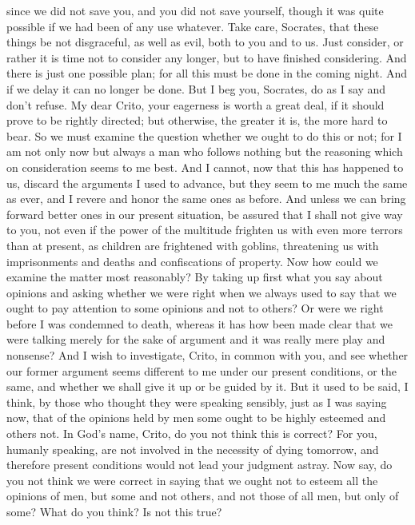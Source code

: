 \documentclass[letterpaper,12pt]{article}
\begin{document}
\begin{drama}
 since we did not save you, and you did not save yourself, though it was quite possible if we had been of any use whatever. Take care, Socrates, that these things be not disgraceful, as well as evil, both to you and to us. Just consider, or rather it is time not to consider any longer, but to have finished considering. And there is just one possible plan; for all this must be done in the coming night. And if we delay it can no longer be done. But I beg you, Socrates, do as I say and don't refuse. 
\socratesspeaks 
My dear Crito, your eagerness is worth a great deal, if it should prove to be rightly directed; but otherwise, the greater it is, the more hard to bear. So we must examine the question whether we ought to do this or not; for I am not only now but always a man who follows nothing but the reasoning which on consideration seems to me best. And I cannot, now that this has happened to us, discard the arguments I used to advance, but they seem to me much the same as ever,  and I revere and honor the same ones as before. And unless we can bring forward better ones in our present situation, be assured that I shall not give way to you, not even if the power of the multitude frighten us with even more terrors than at present, as children are frightened with goblins, threatening us with imprisonments and deaths and confiscations of property. Now how could we examine the matter most reasonably? By taking up first what you say about opinions and asking whether we were right when we always used to say that we ought to pay attention  to some opinions and not to others? Or were we right before I was condemned to death, whereas it has how been made clear that we were talking merely for the sake of argument and it was really mere play and nonsense? And I wish to investigate, Crito, in common with you, and see whether our former argument seems different to me under our present conditions, or the same, and whether we shall give it up or be guided by it. But it used to be said, I think, by those who thought they were speaking sensibly, just as I was saying now, that of the opinions held by men  some ought to be highly esteemed and others not. In God's name, Crito, do you not think this is correct? For you, humanly speaking,  are not involved in the necessity of dying tomorrow, and therefore present conditions would not lead your judgment astray. Now say, do you not think we were correct in saying that we ought not to esteem all the opinions of men, but some and not others, and not those of all men, but only of some? What do you think? Is not this true?

\end{drama}
\end{document}
